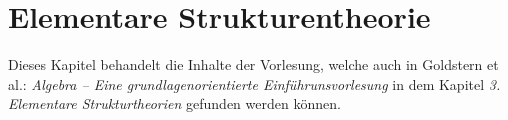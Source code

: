 \chapter{Elementare Strukturentheorie}

Dieses Kapitel behandelt die Inhalte der Vorlesung, welche auch in Goldstern et al.: \textit{Algebra -- Eine grundlagenorientierte Einführunsvorlesung} in dem Kapitel \textit{3. Elementare Strukturtheorien} gefunden werden können.



